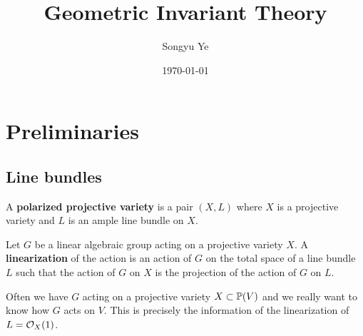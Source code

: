 \documentclass[12pt]{article}
\begin{document}
\rhead{\today}
\cfoot{\thepage}

\title{Geometric Invariant Theory}

\author{Songyu Ye}
\date{\today}
\maketitle


\begin{abstract}
\end{abstract}

\tableofcontents

\section{Preliminaries}
\subsection{Line bundles}
\begin{definition}
     A \textbf{polarized projective variety} is a pair $(X, L)$ where $X$ is a projective variety and $L$ is an ample line bundle on $X$.
\end{definition}

\begin{definition}
    [Linearization] Let $G$ be a linear algebraic group acting on a projective variety $X$. A \textbf{linearization} of the action is an action of $G$ on the total space of a line bundle $L$ such that the action of $G$ on $X$ is the projection of the action of $G$ on $L$.
\end{definition}
\begin{remark}
    Often we have $G$ acting on a projective variety $X \subset \P(V)$ and we really want to know how $G$ acts on $V$. This is precisely the information of the linearization of $L = \cO_X(1)$.
\end{remark}
\end{document}
